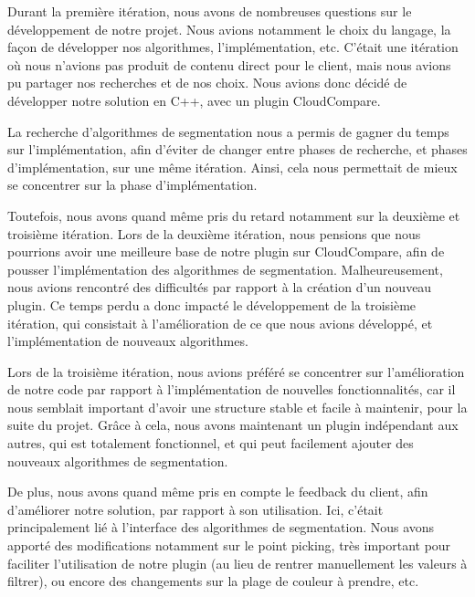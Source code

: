 \documentclass[12pt,titlepage,french]{article}
\begin{document}
Durant la première itération, nous avons de nombreuses questions sur le développement de notre projet. Nous avions notamment le choix du langage, la façon de développer nos algorithmes, l'implémentation, etc. C'était une itération où nous n'avions pas produit de contenu direct pour le client, mais nous avions pu partager nos recherches et de nos choix. Nous avions donc décidé de développer notre solution en C++, avec un plugin CloudCompare. \newline

La recherche d'algorithmes de segmentation nous a permis de gagner du temps sur l'implémentation, afin d'éviter de changer entre phases de recherche, et phases d'implémentation, sur une même itération. Ainsi, cela nous permettait de mieux se concentrer sur la phase d'implémentation. \newline

Toutefois, nous avons quand même pris du retard notamment sur la deuxième et troisième itération. Lors de la deuxième itération, nous pensions que nous pourrions avoir une meilleure base de notre plugin sur CloudCompare, afin de pousser l'implémentation des algorithmes de segmentation. Malheureusement, nous avions rencontré des difficultés par rapport à la création d'un nouveau plugin. Ce temps perdu a donc impacté le développement de la troisième itération, qui consistait à l'amélioration de ce que nous avions développé, et l'implémentation de nouveaux algorithmes. \newline

Lors de la troisième itération, nous avions préféré se concentrer sur l'amélioration de notre code par rapport à l'implémentation de nouvelles fonctionnalités, car il nous semblait important d'avoir une structure stable et facile à maintenir, pour la suite du projet. Grâce à cela, nous avons maintenant un plugin indépendant aux autres, qui est totalement fonctionnel, et qui peut facilement ajouter des nouveaux algorithmes de segmentation. \newline

De plus, nous avons quand même pris en compte le feedback du client, afin d'améliorer notre solution, par rapport à son utilisation. Ici, c'était principalement lié à l'interface des algorithmes de segmentation. Nous avons apporté des modifications notamment sur le point picking, très important pour faciliter l'utilisation de notre plugin (au lieu de rentrer manuellement les valeurs à filtrer), ou encore des changements sur la plage de couleur à prendre, etc. \newline
\end{document}
